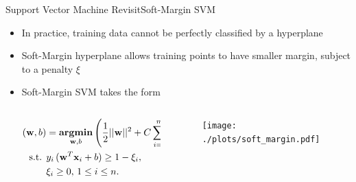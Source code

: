 \documentclass[first=dgreen,second=purple,logo=yellowexc]{aaltoslides}
\newcommand{\argmin}{\textbf{argmin}}
\newcommand{\xb}{{\bf x}}
\newcommand{\wb}{{\bf w}}
\begin{document}
\begin{frame}{Support Vector Machine Revisit}{Soft-Margin SVM \cite{CorVap95}}
\begin{itemize}
    \item In practice, training data cannot be perfectly classified by a hyperplane 
    \item Soft-Margin hyperplane allows training points to have smaller margin, subject to a penalty $\xi$
    \item Soft-Margin SVM takes the form
    \begin{columns}
        \begin{column}{.5\linewidth}
            \begin{align*}
            (\wb,b)  &= \underset{\wb,b}{\operatorname{\argmin}}\left( \frac{1}{2} ||\wb||^2 + C \sum_{i=1}^m \xi_i \right) \text{,}  \\
            \text{ s.t. } & y_i\,(\wb^T \xb_i + b) \ge 1 - \xi_i \text{,}  \\
            & \xi_i \ge 0  \text{, } 1 \leq i \leq n \text{.} 
            \end{align*}
        \end{column}
        \begin{column}{.5\linewidth}
            \begin{figure}
                \texttt{[image: ./plots/soft\_margin.pdf]}
            \end{figure}
        \end{column}
    \end{columns}
\end{itemize}
\end{frame}
\end{document}
